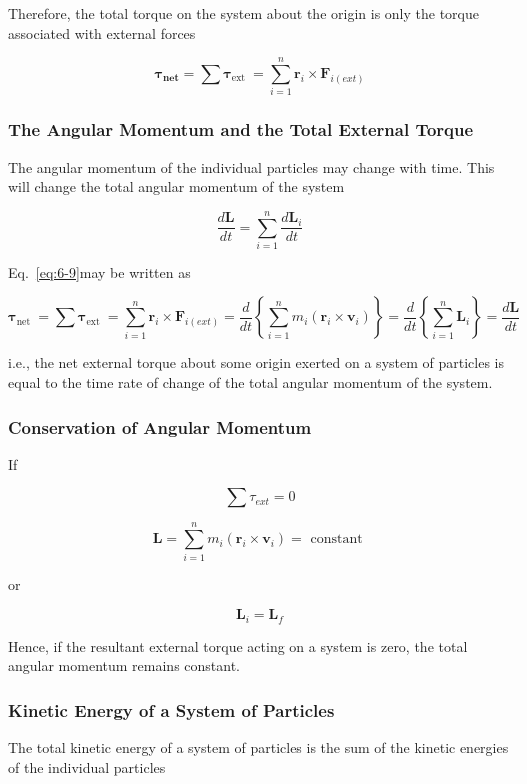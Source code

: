 \documentclass[10pt]{article}
\numberwithin{equation}{section}
\begin{document}
Therefore, the total torque on the system about the origin is only the torque associated with external forces


\begin{equation}
\boldsymbol{\tau}_{\boldsymbol{n e t}}=\sum \boldsymbol{\tau}_{\text {ext }}=\sum_{i=1}^{n} \mathbf{r}_{i} \times \mathbf{F}_{i(e x t)} \label{eq:6-9}
\end{equation}


\subsubsection{The Angular Momentum and the Total External Torque}\label{sec:6-3-11}
The angular momentum of the individual particles may change with time. This will change the total angular momentum of the system

$$
\frac{d \mathbf{L}}{d t}=\sum_{i=1}^{n} \frac{d \mathbf{L}_{i}}{d t}
$$

Eq.~\eqref{eq:6-9}may be written as

$$
\boldsymbol{\tau}_{\text {net }}=\sum \boldsymbol{\tau}_{\text {ext }}=\sum_{i=1}^{n} \mathbf{r}_{i} \times \mathbf{F}_{i(e x t)}=\frac{d}{d t}\left\{\sum_{i=1}^{n} m_{i}\left(\mathbf{r}_{i} \times \mathbf{v}_{i}\right)\right\}=\frac{d}{d t}\left\{\sum_{i=1}^{n} \mathbf{L}_{i}\right\}=\frac{d \mathbf{L}}{d t}
$$

i.e., the net external torque about some origin exerted on a system of particles is equal to the time rate of change of the total angular momentum of the system.

\subsubsection{Conservation of Angular Momentum}\label{sec:6-3-12}
If

$$
\sum \tau_{e x t}=0
$$

$$
\mathbf{L}=\sum_{i=1}^{n} m_{i}\left(\mathbf{r}_{i} \times \mathbf{v}_{i}\right)=\text { constant }
$$

or

$$
\mathbf{L}_{i}=\mathbf{L}_{f}
$$

Hence, if the resultant external torque acting on a system is zero, the total angular momentum remains constant.

\subsubsection{Kinetic Energy of a System of Particles}\label{sec:6-3-13}
The total kinetic energy of a system of particles is the sum of the kinetic energies of the individual particles
\end{document}
